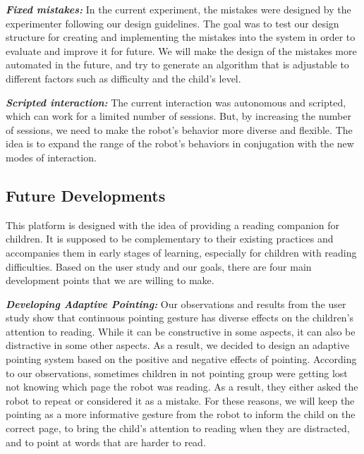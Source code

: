 \documentclass{sigchi}
\begin{document}
\textbf{\textit{Fixed mistakes:}}
In the current experiment, the mistakes were designed by the experimenter following our design guidelines.
The goal was to test our design structure for creating and implementing the mistakes into the system in order to evaluate and improve it for future.
We will make the design of the mistakes more automated in the future, and try to generate an algorithm that is adjustable to different factors such as difficulty and the child's level.


\textbf{\textit{Scripted interaction:}}
The current interaction was autonomous and scripted, which can work for a limited number of sessions.
But, by increasing the number of sessions, we need to make the robot's behavior more diverse and flexible.
The idea is to expand the range of the robot's behaviors in conjugation with the new modes of interaction.



\subsection{Future Developments}
This platform is designed with the idea of providing a reading companion for children. 
It is supposed to be complementary to their existing practices and accompanies them in early stages of learning, especially for children with reading difficulties.
Based on the user study and our goals, there are four main development points that we are willing to make.

\textbf{\textit{Developing Adaptive Pointing:}}
Our observations and results from the user study show that continuous pointing gesture has diverse effects on the children's attention to reading.
While it can be constructive in some aspects, it can also be distractive in some other aspects. 
As a result, we decided to design an adaptive pointing system based on the positive and negative effects of pointing.
According to our observations, sometimes children in not pointing group were getting lost not knowing which page the robot was reading.
As a result, they either asked the robot to repeat or considered it as a mistake.
For these reasons, we will keep the pointing as a more informative gesture from the robot to inform the child on the correct page, to bring the child's attention to reading when they are distracted, and to point at words that are harder to read.
\end{document}
